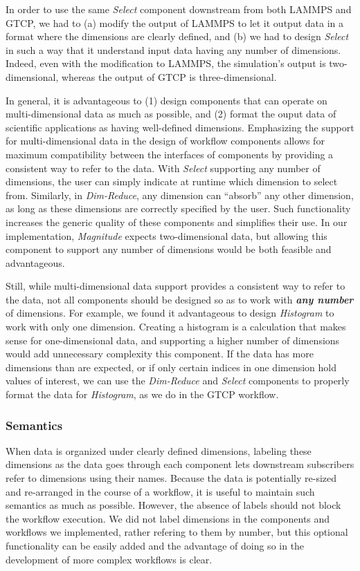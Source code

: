 \documentclass[conference]{IEEEtran}
\begin{document}
In order to use the same {\em Select} component downstream from both LAMMPS and
GTCP, we had to (a) modify the output of LAMMPS to let it output data in a
format where the dimensions are clearly defined, and (b) we had to design {\em
Select} in such a way that it understand input data having any number of
dimensions.  Indeed, even with the modification to LAMMPS, the simulation’s
output is two-dimensional, whereas the output of GTCP is three-dimensional.

In general, it is advantageous to (1) design components that can operate on
multi-dimensional data as much as possible, and (2) format the ouput data of
scientific applications as having well-defined dimensions. Emphasizing the
support for multi-dimensional data in the design of workflow components allows
for maximum compatibility between the interfaces of components by providing a
consistent way to refer to the data. With {\em Select} supporting any number of
dimensions, the user can simply indicate at runtime which dimension to select
from. Similarly, in {\em Dim-Reduce}, any dimension can ``absorb'' any other
dimension, as long as these dimensions are correctly specified by the user.
Such functionality increases the generic quality of these components and
simplifies their use. In our implementation, {\em Magnitude} expects
two-dimensional data, but allowing this component to support any number of
dimensions would be both feasible and advantageous.

Still, while multi-dimensional data support provides a consistent way to refer
to the data, not all components should be designed so as to work with
\textbf{\em any number} of dimensions. For example, we found it advantageous to
design {\em Histogram} to work with only one dimension. Creating a histogram is
a calculation that makes sense for one-dimensional data, and supporting a
higher number of dimensions would add unnecessary complexity this component. If
the data has more dimensions than are expected, or if only certain indices in
one dimension hold values of interest, we can use the {\em Dim-Reduce} and {\em
Select} components to properly format the data for {\em Histogram}, as we do in
the GTCP workflow.

\subsubsection{Semantics}

When data is organized under clearly defined dimensions, labeling these
dimensions as the data goes through each component lets downstream subscribers
refer to dimensions using their names. Because the data is potentially re-sized
and re-arranged in the course of a workflow, it is useful to maintain such
semantics as much as possible. However, the absence of labels should not block
the workflow execution. We did not label dimensions in the components and
workflows we implemented, rather refering to them by number, but this optional
functionality can be easily added and the advantage of doing so in the
development of more complex workflows is clear.
\end{document}
